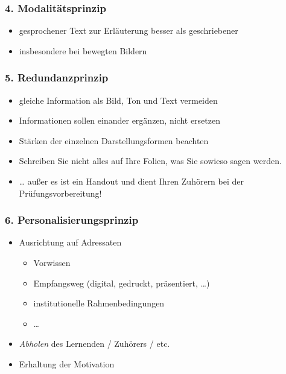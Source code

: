 \begin{frame}
\frametitle{4. Modalitätsprinzip}

\begin{itemize}
	\item gesprochener Text zur Erläuterung besser als geschriebener
	\item insbesondere bei bewegten Bildern
\end{itemize}
\end{frame}


\begin{frame}
\frametitle{5. Redundanzprinzip}

\begin{itemize}
	\item gleiche Information als Bild, Ton und Text vermeiden
	\item Informationen sollen einander ergänzen, nicht ersetzen
	\item Stärken der einzelnen Darstellungsformen beachten
\end{itemize}

\vspace{1cm}

\begin{itemize}
	\item {\color{gray} Schreiben Sie nicht alles auf Ihre Folien, was Sie sowieso sagen werden.}
	\item {\color{lightgray} \dots{} außer es ist ein Handout und dient Ihren Zuhörern bei der Prüfungsvorbereitung!}
\end{itemize}
\end{frame}


\begin{frame}
\frametitle{6. Personalisierungsprinzip}

\begin{itemize}
	\item Ausrichtung auf Adressaten
	\begin{itemize}
		\item Vorwissen
		\item Empfangsweg (digital, gedruckt, präsentiert, \dots)
		\item institutionelle Rahmenbedingungen
		\item \dots
	\end{itemize}
	\item \textit{Abholen} des Lernenden / Zuhörers / etc.
	\item Erhaltung der Motivation
\end{itemize}
\end{frame}



